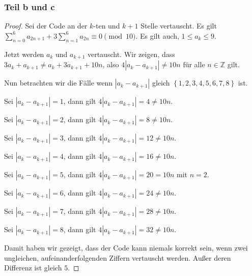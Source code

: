 \documentclass[a5paper]{article}
\providecommand{\abs}[1]{\left\lvert#1\right\rvert}
\theoremstyle{remark}
\begin{document}
\subsubsection{Teil b und c}
\begin{proof}
  Sei der Code an der \(k\)-ten und \(k+1\) Stelle vertauscht.
  Es gilt $\sum_{n=0}^6{a_{2n+1}}+3\sum_{n=1}^6{a_{2n}} \equiv 0
  \pmod{10}$.  Es gilt auch, \(1 \leq a_k \leq 9\).

Jetzt werden \(a_k\) und \(a_{k+1}\) vertauscht.  Wir zeigen, dass
$3a_k+a_{k+1} \neq a_k+3a_{k+1}+10n$, also
$4\abs{a_k-a_{k+1}} \neq 10n$ für alle \(n \in \mathbb{Z}\)
gilt.

Nun betrachten wir die Fälle wenn
$\abs{a_k-a_{k+1}}$ gleich \(\left\{ 1,2,3,4,5,6,7,8 \right\}\) ist.

Sei \(\abs{a_k-a_{k+1}}=1\), dann gilt \(4\abs{a_k-a_{k+1}} =4 \neq 10n\).

Sei \(\abs{a_k-a_{k+1}}=2\), dann gilt \(4\abs{a_k-a_{k+1}} =8 \neq 10n\).

Sei \(\abs{a_k-a_{k+1}}=3\), dann gilt \(4\abs{a_k-a_{k+1}} =12 \neq 10n\).

Sei \(\abs{a_k-a_{k+1}}=4\), dann gilt \(4\abs{a_k-a_{k+1}} =16 \neq 10n\).

Sei \(\abs{a_k-a_{k+1}}=5\), dann gilt $4\abs{a_k-a_{k+1}} =20 =
10n$ mit \(n=2\).

Sei \(\abs{a_k-a_{k+1}}=6\), dann gilt \(4\abs{a_k-a_{k+1}} =24 \neq 10n\).

Sei \(\abs{a_k-a_{k+1}}=7\), dann gilt \(4\abs{a_k-a_{k+1}} =28 \neq 10n\).

Sei \(\abs{a_k-a_{k+1}}=8\), dann gilt \(4\abs{a_k-a_{k+1}} =32 \neq 10n\).

Damit haben wir gezeigt, dass der Code kann niemals korrekt sein, wenn
zwei ungleichen, aufeinanderfolgenden Ziffern vertauscht werden.
Außer deren Differenz ist gleich \(5\).
\end{proof}
\end{document}
